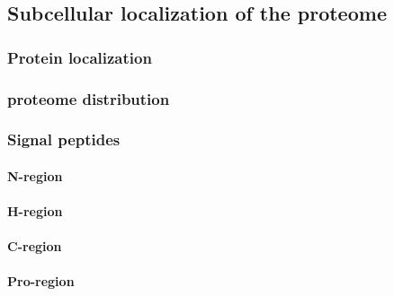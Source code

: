 \documentclass[a4paper]{article}
\begin{document}
	\subsection{Subcellular localization of the proteome}
		\subsubsection{Protein localization}
			
		\subsubsection{proteome distribution}
			
		\subsubsection{Signal peptides}
			
			
			
			\paragraph{N-region}
				
			\paragraph{H-region}
				
			\paragraph{C-region}
				
			\paragraph{Pro-region}
				
\end{document}

